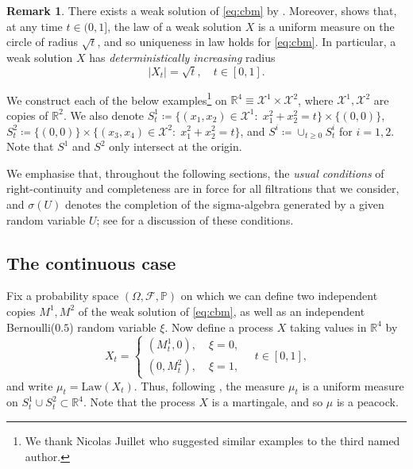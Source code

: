 \documentclass[12pt,oneside]{amsart}
\theoremstyle{definition}
\newtheorem{remark}[theorem]{Remark}
\newcommand{\F}{\mathcal F}
\newcommand{\Law}{\mathrm{Law}}
\newcommand{\R}{\mathbb R}
\newcommand{\X}{\mathcal X}
\def\P{{\mathbb P}}
\def\R{{\mathbb R}}
\numberwithin{equation}{section}
\begin{document}
\begin{remark}\label{rem:cbm}
	There exists a weak solution of \eqref{eq:cbm} by \cite[Theorem 4.3]{LaRu20}. Moreover, \cite[Theorem 1.1]{CoRo22} shows that, at any time $t \in (0, 1]$, the law of a weak solution $X$ is a uniform measure on the circle of radius $\sqrt{t}$, and so uniqueness in law holds for \eqref{eq:cbm}. In particular, a weak solution $X$ has \emph{deterministically increasing} radius
	\begin{equation}\label{eq:radius}
		|X_t| = \sqrt{t}, \quad t \in [0, 1].
	\end{equation}
\end{remark}

We construct each of the below examples\footnote{We thank Nicolas Juillet who suggested similar examples to the third named author.}  on $\R^4 \equiv \X^1 \times \X^2$, where $\X^1, \X^2$ are copies of $\R^2$. 
We also denote $S^1_t \coloneqq \{(x_1, x_2) \in \X^1 \colon \; x_1^2 + x_2^2 = t\} \times \{(0, 0)\}$, $S^2_t \coloneqq \{(0, 0)\} \times \{(x_3, x_4) \in \X^2 \colon \; x_1^2 + x_2^2 = t\}$, and $S^i \coloneqq \cup_{t \ge 0} S^i_t$ for $i = 1,2$.
Note that $S^1$ and $S^2$ only intersect at the origin.

We emphasise that, throughout the following sections, the \emph{usual conditions} of right-continuity and completeness are in force for all filtrations that we consider, and $\sigma(U)$ denotes the completion of the sigma-algebra generated by a given random variable $U$; see  for a discussion of these conditions.

\subsection{The continuous case}

Fix a probability space $(\Omega, \F, \P)$ on which we can define two independent copies $M^1, M^2$ of the weak solution of \eqref{eq:cbm}, as well as an independent Bernoulli($0.5$) random variable $\xi$.
Now define a process $X$ taking values in $\R^4$ by
\begin{equation}\label{eq:r4-simple}
	X_t = \begin{cases}
		(M^1_t, 0), \; & \xi = 0,\\
		(0, M^2_t), & \xi = 1,
	\end{cases}\quad t \in [0, 1],
\end{equation}
and write $\mu_t = \Law(X_t)$. Thus, following , the measure $\mu_t$ is a uniform measure on $S^1_t \cup S^2_t \subset \R^4$. Note that the process $X$ is a martingale, and so $\mu$ is a peacock.
\end{document}

